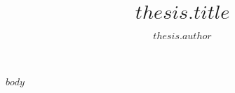 \documentclass[12pt, b5paper,twoside]{upfthesis}
\title{$thesis.title$}
\author{$thesis.author$}
\begin{document}
\frontmatter

\maketitle

$body$


\backmatter

\printindex
\end{document}
